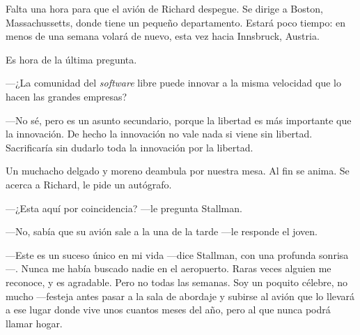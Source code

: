\documentclass[oneside,twocolumn]{article}
\begin{document}
Falta una hora para que el avión de Richard despegue. Se dirige a Boston, Massachussetts, donde tiene un 
pequeño departamento. Estará poco tiempo: en menos de una semana volará de nuevo, esta vez hacia Innsbruck, 
Austria.

Es hora de la última pregunta.

---¿La comunidad del \emph{software} libre puede innovar a la misma velocidad que lo hacen las grandes
empresas?

---No sé, pero es un asunto secundario, porque la libertad es más importante que la innovación. De hecho la 
innovación no vale nada si viene sin libertad. Sacrificaría sin dudarlo toda la innovación por la libertad.

Un muchacho delgado y moreno deambula por nuestra mesa. Al fin se anima. Se acerca a Richard, le pide un 
autógrafo.

---¿Esta aquí por coincidencia? ---le pregunta Stallman.

---No, sabía que su avión sale a la una de la tarde ---le responde el joven.

---Este es un suceso único en mi vida ---dice Stallman, con una profunda sonrisa---. Nunca me había buscado nadie en el aeropuerto. Raras veces alguien me reconoce, y es agradable. Pero no todas las semanas. Soy un poquito célebre, no mucho ---festeja antes pasar a la sala de abordaje y subirse al avión que lo llevará a ese lugar donde vive unos cuantos meses del año, pero al que nunca podrá llamar hogar.	
\end{document}
